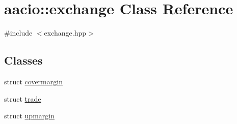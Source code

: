 \hypertarget{classaacio_1_1exchange}{}\section{aacio\+:\+:exchange Class Reference}
\label{classaacio_1_1exchange}


{\ttfamily \#include $<$exchange.\+hpp$>$}

\subsection*{Classes}
\begin{DoxyCompactItemize}
\item 
struct \mbox{\hyperlink{structaacio_1_1exchange_1_1covermargin}{covermargin}}
\item 
struct \mbox{\hyperlink{structaacio_1_1exchange_1_1trade}{trade}}
\item 
struct \mbox{\hyperlink{structaacio_1_1exchange_1_1upmargin}{upmargin}}
\end{DoxyCompactItemize}
